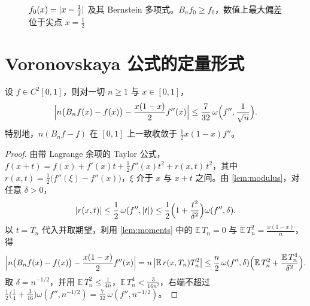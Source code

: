 \documentclass{mojing-paper}
\begin{document}
\begin{figure}[htbp]
\centering
{}
\caption{$f_0(x)=\abs{x-\frac12}$ 及其 Bernstein 多项式。$B_nf_0\ge f_0$，数值上最大偏差位于尖点 $x=\frac12$}
\label{fig:bernstein}
\end{figure}

\section{Voronovskaya 公式的定量形式}

\begin{theorem}\label{thm:voronovskaya}
设 $f\in C^2[0,1]$，则对一切 $n\ge1$ 与 $x\in[0,1]$，
\begin{equation}\label{eq:voronovskaya}
  \Bigl\lvert n\bigl(B_nf(x)-f(x)\bigr)-\frac{x(1-x)}{2}f''(x)\Bigr\rvert
  \le\frac{7}{32}\,\omega\Bigl(f'',\frac{1}{\sqrt n}\Bigr).
\end{equation}
特别地，$n(B_nf-f)$ 在 $[0,1]$ 上一致收敛于 $\frac12x(1-x)f''$。
\end{theorem}

\begin{proof}
由带 Lagrange 余项的 Taylor 公式，$f(x+t)=f(x)+f'(x)t+\frac12f''(x)t^2+r(x,t)\,t^2$，其中
$r(x,t)=\frac12\bigl(f''(\xi)-f''(x)\bigr)$，$\xi$ 介于 $x$ 与 $x+t$ 之间。由 \cref{lem:modulus}，对任意 $\delta>0$，
\[
  \abs{r(x,t)}\le\frac12\,\omega(f'',\abs{t})\le\frac12\Bigl(1+\frac{t^2}{\delta^2}\Bigr)\omega(f'',\delta).
\]
以 $t=T_n$ 代入并取期望，利用 \cref{lem:moments} 中的 $\mathbb{E}\,T_n=0$ 与 $\mathbb{E}\,T_n^2=\frac{x(1-x)}{n}$，得
\[
  \Bigl\lvert n\bigl(B_nf(x)-f(x)\bigr)-\frac{x(1-x)}{2}f''(x)\Bigr\rvert
  =n\,\abs[\big]{\mathbb{E}\,r(x,T_n)T_n^2}
  \le\frac n2\,\omega(f'',\delta)\Bigl(\mathbb{E}\,T_n^2+\frac{\mathbb{E}\,T_n^4}{\delta^2}\Bigr).
\]
取 $\delta=n^{-1/2}$，并用 $\mathbb{E}\,T_n^2\le\frac{1}{4n}$，$\mathbb{E}\,T_n^4<\frac{3}{16n^2}$，右端不超过
$\frac12\bigl(\frac14+\frac{3}{16}\bigr)\omega(f'',n^{-1/2})=\frac{7}{32}\,\omega(f'',n^{-1/2})$。
\end{proof}
\end{document}
